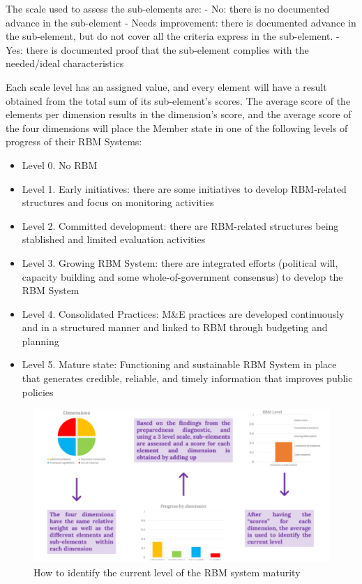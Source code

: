 \documentclass[
  10pt,
]{book}
\providecommand{\tightlist}{%
  \setlength{\itemsep}{0pt}\setlength{\parskip}{0pt}}
\begin{document}
The scale used to assess the sub-elements are:
- No: there is no documented advance in the sub-element
- Needs improvement: there is documented advance in the sub-element, but do not cover all the criteria express in the sub-element.
- Yes: there is documented proof that the sub-element complies with the needed/ideal characteristics

Each scale level has an assigned value, and every element will have a result obtained from the total sum of its sub-element's scores. The average score of the elements per dimension results in the dimension's score, and the average score of the four dimensions will place the Member state in one of the following levels of progress of their RBM Systems:

\begin{itemize}
\tightlist
\item
  Level 0. No RBM
\item
  Level 1. Early initiatives: there are some initiatives to develop RBM-related structures and focus on monitoring activities
\item
  Level 2. Committed development: there are RBM-related structures being stablished and limited evaluation activities
\item
  Level 3. Growing RBM System: there are integrated efforts (political will, capacity building and some whole-of-government consensus) to develop the RBM System
\item
  Level 4. Consolidated Practices: M\&E practices are developed continuously and in a structured manner and linked to RBM through budgeting and planning
\item
  Level 5. Mature state: Functioning and sustainable RBM System in place that generates credible, reliable, and timely information that improves public policies
\end{itemize}

\begin{figure}
\includegraphics[width=1\linewidth]{./images/figure_8} \caption{How to identify the current level of the RBM system maturity}\label{fig:figure8}
\end{figure}
\end{document}
